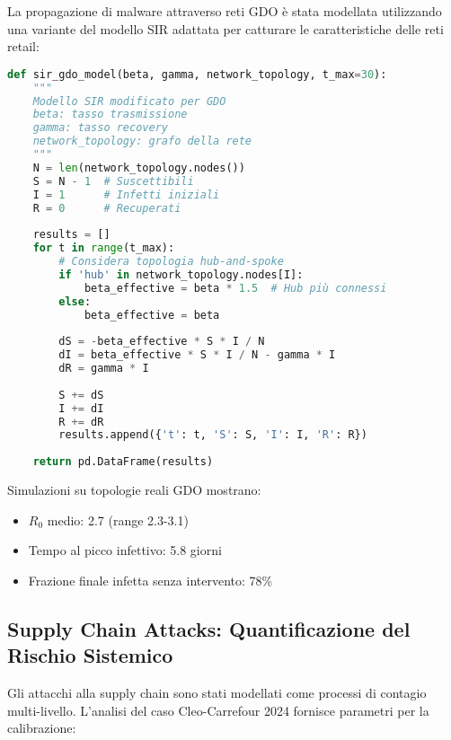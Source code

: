La propagazione di malware attraverso reti GDO è stata modellata utilizzando una variante del modello SIR adattata per catturare le caratteristiche delle reti retail:

\begin{lstlisting}[language=Python, caption=Modello SIR modificato per GDO]
def sir_gdo_model(beta, gamma, network_topology, t_max=30):
    """
    Modello SIR modificato per GDO
    beta: tasso trasmissione
    gamma: tasso recovery
    network_topology: grafo della rete
    """
    N = len(network_topology.nodes())
    S = N - 1  # Suscettibili
    I = 1      # Infetti iniziali
    R = 0      # Recuperati
    
    results = []
    for t in range(t_max):
        # Considera topologia hub-and-spoke
        if 'hub' in network_topology.nodes[I]:
            beta_effective = beta * 1.5  # Hub più connessi
        else:
            beta_effective = beta
        
        dS = -beta_effective * S * I / N
        dI = beta_effective * S * I / N - gamma * I
        dR = gamma * I
        
        S += dS
        I += dI
        R += dR
        results.append({'t': t, 'S': S, 'I': I, 'R': R})
    
    return pd.DataFrame(results)
\end{lstlisting}

Simulazioni su topologie reali GDO mostrano:
\begin{itemize}
\item $R_0$ medio: 2.7 (range 2.3-3.1)
\item Tempo al picco infettivo: 5.8 giorni
\item Frazione finale infetta senza intervento: 78\%
\end{itemize}

\subsection{Supply Chain Attacks: Quantificazione del Rischio Sistemico}

Gli attacchi alla supply chain sono stati modellati come processi di contagio multi-livello. L'analisi del caso Cleo-Carrefour 2024 fornisce parametri per la calibrazione:

